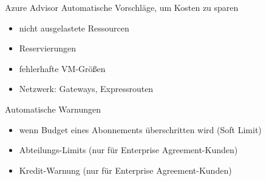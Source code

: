 \begin{flashcard}[Definition]{Azure Advisor}
  Automatische Vorschläge, um Kosten zu sparen
  \begin{itemize}
    \item nicht ausgelastete Ressourcen
    \item Reservierungen
    \item fehlerhafte VM-Größen
    \item Netzwerk: Gateways, Expressrouten
  \end{itemize}
\end{flashcard}

\begin{flashcard}[Definition]{Automatische Warnungen}
  
  \begin{itemize}
    \item wenn Budget eines Abonnements überschritten wird (Soft Limit)
    \item Abteilungs-Limits (nur für Enterprise Agreement-Kunden)
    \item Kredit-Warnung (nur für Enterprise Agreement-Kunden)
  \end{itemize}
\end{flashcard}

